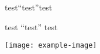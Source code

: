 \documentclass{ctexart}
\begin{document}
\lipsum[1]%

test“test”test

test ``test'' test

\texttt{[image: example-image]}%

\zhlipsum[1]%
\end{document}
